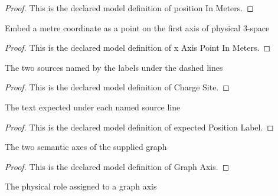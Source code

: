 \begin{proof}
  This is the declared model definition of position In Meters.
\end{proof}
\begin{definition}
  \label{def:physics:phyx-mini-0862:phyxminiproblems-problemphyxmini0862-xaxispointinmeters}
  Embed a metre coordinate as a point on the first axis of physical 3-space
\end{definition}
\begin{proof}
  This is the declared model definition of x Axis Point In Meters.
\end{proof}
\begin{definition}
  \label{def:physics:phyx-mini-0862:phyxminiproblems-problemphyxmini0862-chargesite}
  The two sources named by the labels under the dashed lines
\end{definition}
\begin{proof}
  This is the declared model definition of Charge Site.
\end{proof}
\begin{definition}
  \label{def:physics:phyx-mini-0862:phyxminiproblems-problemphyxmini0862-expectedpositionlabel}
  The text expected under each named source line
\end{definition}
\begin{proof}
  This is the declared model definition of expected Position Label.
\end{proof}
\begin{definition}
  \label{def:physics:phyx-mini-0862:phyxminiproblems-problemphyxmini0862-graphaxis}
  The two semantic axes of the supplied graph
\end{definition}
\begin{proof}
  This is the declared model definition of Graph Axis.
\end{proof}
\begin{definition}
  \label{def:physics:phyx-mini-0862:phyxminiproblems-problemphyxmini0862-graphaxisrole}
  The physical role assigned to a graph axis
\end{definition}
